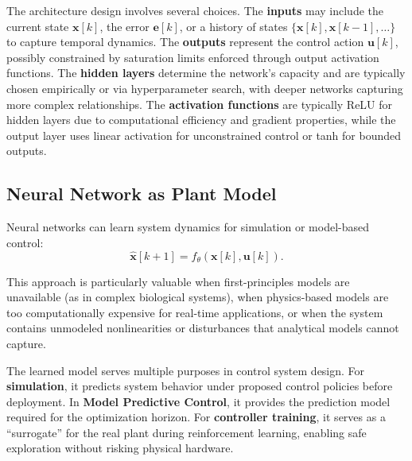 The architecture design involves several choices. The \textbf{inputs} may include the current state $\mathbf{x}[k]$, the error $\mathbf{e}[k]$, or a history of states $\{\mathbf{x}[k], \mathbf{x}[k-1], \ldots\}$ to capture temporal dynamics. The \textbf{outputs} represent the control action $\mathbf{u}[k]$, possibly constrained by saturation limits enforced through output activation functions. The \textbf{hidden layers} determine the network's capacity and are typically chosen empirically or via hyperparameter search, with deeper networks capturing more complex relationships. The \textbf{activation functions} are typically ReLU for hidden layers due to computational efficiency and gradient properties, while the output layer uses linear activation for unconstrained control or tanh for bounded outputs.

\subsection{Neural Network as Plant Model}

Neural networks can learn system dynamics for simulation or model-based control:
\begin{equation}
\hat{\mathbf{x}}[k+1] = f_{\theta}(\mathbf{x}[k], \mathbf{u}[k]).
\label{eq:nn_model}
\end{equation}

This approach is particularly valuable when first-principles models are unavailable (as in complex biological systems), when physics-based models are too computationally expensive for real-time applications, or when the system contains unmodeled nonlinearities or disturbances that analytical models cannot capture.

The learned model serves multiple purposes in control system design. For \textbf{simulation}, it predicts system behavior under proposed control policies before deployment. In \textbf{Model Predictive Control}, it provides the prediction model required for the optimization horizon. For \textbf{controller training}, it serves as a ``surrogate'' for the real plant during reinforcement learning, enabling safe exploration without risking physical hardware.

